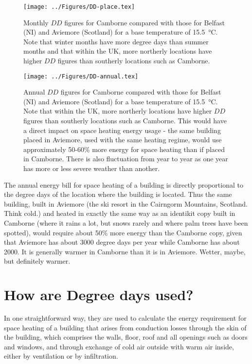 \documentclass[parskip=half]{scrartcl}
\begin{document}
\begin{figure}[ht]
\texttt{[image: ../Figures/DD-place.tex]}
\caption{Monthly $DD$ figures for Camborne compared with those for Belfast (NI) and Aviemore (Scotland) for a base temperature of \SI{15.5}{\celsius}. Note that winter months have more degree days than summer months and that within the UK, more northerly locations have higher $DD$ figures than southerly locations such as Camborne.}
\label{fig:DD_by_month}
\end{figure}

\begin{figure}
\texttt{[image: ../Figures/DD-annual.tex]}
\caption{Annual $DD$ figures for Camborne compared with those for Belfast (NI) and Aviemore (Scotland) for a base temperature of \SI{15.5}{\celsius}. Note that  within the UK, more northerly locations have higher $DD$ figures than southerly locations such as Camborne. This would have a direct impact on space heating energy usage - the same building placed in Aviemore, used with the same heating regime, would use approximately 50-60\% more energy for space heating than if placed in Camborne. There is also fluctuation from year to year as one year has more or less severe weather than another.}
\label{fig:DD_annual}
\end{figure}


The annual energy  bill for space heating of a building is directly proportional to the degree days of the location where the building is located. Thus the same building, built in Aviemore (the ski resort in the Cairngorm Mountains, Scotland. Think cold.) and heated in exactly the same way as an identikit copy built in Camborne (where it rains a lot, but snows rarely and where palm trees have been spotted), would require about 50\% more energy than the Camborne copy, given that Aviemore has about 3000 degree days per year while Camborne has about 2000. It is generally warmer in Camborne than it is in Aviemore. Wetter, maybe, but definitely warmer.

\section{How are Degree days used?}

In one straightforward way, they are used to calculate the energy requirement for space heating of a building that arises from conduction losses through the skin of the building, which comprises the walls, floor, roof and all openings such as doors and windows, and through exchange of cold air outside with warm air inside, either by ventilation or by infiltration.
\end{document}
